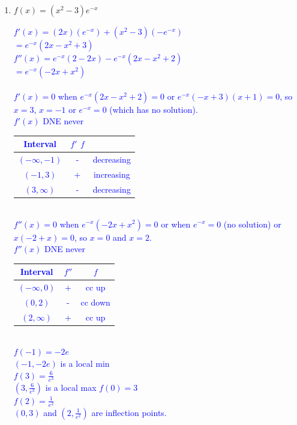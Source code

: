 \documentclass{ximera}
\begin{document}
\begin{exercise}
\begin{enumerate}
    \item $f(x)=(x^2-3)e^{-x}$ \\
    \textcolor{blue}{$f'(x)=(2x)(e^{-x})+(x^2-3)(-e^{-x})$\\
    $=e^{-x}(2x-x^2+3)$\\
    $f''(x)=e^{-x}(2-2x)-e^{-x}(2x-x^2+2)$\\
    $=e^{-x}(-2x+x^2)$\\
    \\
    $f'(x)=0$ when $e^{-x}(2x-x^2+2)=0$ or $e^{-x}(-x+3)(x+1)=0$, so $x=3$, $x=-1$ or $e^{-x}=0$ (which has no solution).\\
    $f'(x)$ DNE never\\
    \begin{tabular}{c|c|c}
        Interval & $f'$ $f$ \\ \hline
        $(-\infty,-1)$ & - & decreasing\\
        $(-1,3)$ & + & increasing \\
        $(3,\infty)$ & - & decreasing\\    
    \end{tabular}
    \\
    $f''(x)=0$ when $e^{-x}(-2x+x^2)=0$ or when $e^{-x}=0$ (no solution) or $x(-2+x)=0$, so $x=0$ and $x=2$.\\
    $f''(x)$ DNE never\\
    \begin{tabular}{c|c|c}
        Interval & $f''$ & $f$\\ \hline
        $(-\infty, 0)$ & + & cc up \\
        $(0,2)$ & - & cc down \\
        $(2,\infty)$ & + & cc up \\
    \end{tabular}
    \\
    $f(-1)=-2e$ \\
    $(-1,-2e)$ is a local min\\
    $f(3)=\frac{6}{e^3}$\\
    $(3,\frac{6}{e^3})$ is a local max
    $f(0)=3$\\
    $f(2)=\frac{1}{e^2}$\\
    $(0,3)$ and $(2,\frac{1}{e^2})$ are inflection points.\\
    \begin{image} 
    \end{image}
    }


\end{enumerate}
\end{exercise}
\end{document}

